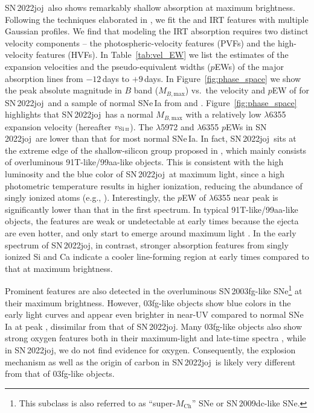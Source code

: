 \documentclass[twocolumn]{aastex631}
\newcommand{\sn}{SN\,2022joj}
\newcommand{\Mch}{$M_\mathrm{Ch}$}
\begin{document}
\begin{CJK*}{UTF8}{gbsn}
\sn\ also shows remarkably shallow  absorption at maximum brightness. Following the techniques elaborated in \citet{Liu_20jgb_2023} \citep[see also][]{Childress_2013,Childress_2014,Maguire_2014}, we fit the  and  IRT features with multiple Gaussian profiles. We find that modeling the  IRT absorption requires two distinct velocity components -- the photospheric-velocity features (PVFs) and the high-velocity features (HVFs). In Table~\ref{tab:vel_EW} we list the estimates of the expansion velocities and the pseudo-equivalent widths ($p$EWs) of the major absorption lines from $-12$\,days to $+9$\,days. In Figure~\ref{fig:phase_space} we show the peak absolute magnitude in $B$ band ($M_{B,\mathrm{max}}$) vs.\ the velocity and $p$EW of  for \sn\ and a sample of normal SNe\,Ia from \citet{Zheng_2018} and \citet{Burrow_2020}. Figure~\ref{fig:phase_space} highlights that \sn\ has a normal $M_{B,\mathrm{max}}$ with a relatively low  $\lambda$6355 expansion velocity (hereafter $v_\mathrm{Si\,\textsc{ii}}$). The  $\lambda$5972 and  $\lambda$6355 $p$EWs in \sn\ are lower than that for most normal SNe\,Ia. In fact, \sn\ sits at the extreme edge of the shallow-silicon group proposed in \citet{Branch_2006}, which mainly consists of overluminous 91T-like/99aa-like objects. This is consistent with the high luminosity and the blue color of \sn\ at maximum light, since a high photometric temperature results in higher ionization, reducing the abundance of singly ionized atoms (e.g., ). Interestingly, the $p$EW of  $\lambda$6355 near peak is significantly lower than that in the first spectrum. In typical 91T-like/99aa-like objects, the  features are weak or undetectable at early times because the ejecta are even hotter, and only start to emerge around maximum light \citep{Filippenko_91T_1992}. In the early spectrum of \sn, in contrast, stronger absorption features from singly ionized Si and Ca indicate a cooler line-forming region at early times compared to that at maximum brightness.

Prominent  features are also detected in the overluminous SN\,2003fg-like \citep[03fg-like;][]{Howell_2006} SNe\footnote{This subclass is also referred to as ``super-\Mch'' SNe or SN\,2009dc-like \citep[09dc-like;][]{Taubenberger_2011} SNe.} at their maximum brightness. However, 03fg-like objects show blue colors in the early light curves \citep{Taubenberger_2019} and appear even brighter in near-UV compared to normal SNe\,Ia at peak \citep{Brown_2014}, dissimilar from that of \sn. Many 03fg-like objects also show strong oxygen features both in their maximum-light and late-time spectra \citep{Taubenberger_2019}, while in \sn, we do not find evidence for oxygen. Consequently, the explosion mechanism as well as the origin of carbon in \sn\ is likely very different from that of 03fg-like objects.


\end{CJK*}
\end{document}
